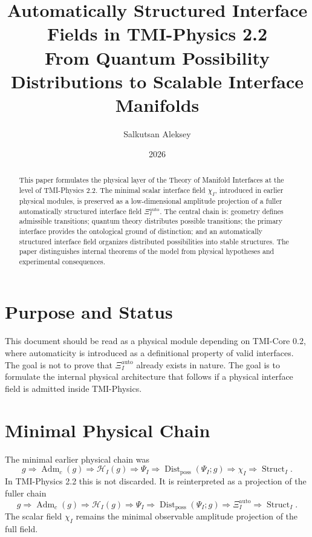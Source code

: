 \documentclass[12pt,a4paper]{article}
\title{\textbf{Automatically Structured Interface Fields in TMI-Physics 2.2}\\
\large From Quantum Possibility Distributions to Scalable Interface Manifolds}
\author{Salkutsan Aleksey}
\date{2026}
\DeclareMathOperator{\Adm}{Adm}
\DeclareMathOperator{\Struct}{Struct}
\DeclareMathOperator{\Dist}{Dist}
\newcommand{\Hcal}{\mathcal H}
\newcommand{\XiAuto}{\Xi_I^{\mathrm{auto}}}
\begin{document}
\maketitle

\begin{abstract}
This paper formulates the physical layer of the Theory of Manifold Interfaces at the level of TMI-Physics 2.2. The minimal scalar interface field \(\chi_I\), introduced in earlier physical modules, is preserved as a low-dimensional amplitude projection of a fuller automatically structured interface field \(\Xi_I^{\mathrm{auto}}\). The central chain is: geometry defines admissible transitions; quantum theory distributes possible transitions; the primary interface provides the ontological ground of distinction; and an automatically structured interface field organizes distributed possibilities into stable structures. The paper distinguishes internal theorems of the model from physical hypotheses and experimental consequences.
\end{abstract}

\tableofcontents
\newpage

\section{Purpose and Status}
This document should be read as a physical module depending on TMI-Core 0.2, where automaticity is introduced as a definitional property of valid interfaces. The goal is not to prove that \(\Xi_I^{\mathrm{auto}}\) already exists in nature. The goal is to formulate the internal physical architecture that follows if a physical interface field is admitted inside TMI-Physics.

\section{Minimal Physical Chain}
The minimal earlier physical chain was
\begin{equation}
\boxed{g\Rightarrow\Adm_c(g)\Rightarrow\Hcal_I(g)\Rightarrow\Psi_I\Rightarrow\Dist_{\mathrm{poss}}(\Psi_I;g)\Rightarrow\chi_I\Rightarrow\Struct_I.}
\end{equation}
In TMI-Physics 2.2 this is not discarded. It is reinterpreted as a projection of the fuller chain
\begin{equation}
\boxed{g\Rightarrow\Adm_c(g)\Rightarrow\Hcal_I(g)\Rightarrow\Psi_I\Rightarrow\Dist_{\mathrm{poss}}(\Psi_I;g)\Rightarrow\XiAuto\Rightarrow\Struct_I.}
\end{equation}
The scalar field \(\chi_I\) remains the minimal observable amplitude projection of the full field.
\end{document}
